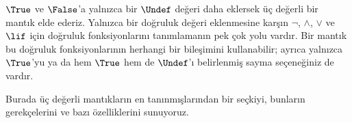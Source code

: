 \documentclass[../../../include/open-logic-section]{subfiles}
\begin{document}


$\True$ ve $\False$'a yalnızca bir $\Undef$ değeri daha eklersek üç değerli
bir mantık elde ederiz. Yalnızca bir doğruluk değeri eklenmesine karşın
$\lnot$, $\land$, $\lor$ ve $\lif$ için doğruluk fonksiyonlarını
tanımlamanın pek çok yolu vardır. Bir mantık bu doğruluk fonksiyonlarının
herhangi bir bileşimini kullanabilir; ayrıca yalnızca $\True$'yu ya da hem
$\True$ hem de $\Undef$'ı belirlenmiş sayma seçeneğiniz de vardır.

Burada üç değerli mantıkların en tanınmışlarından bir seçkiyi, bunların
gerekçelerini ve bazı özelliklerini sunuyoruz.
\end{document}
